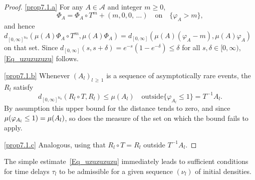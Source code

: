 \documentclass[AHL,Unicode,longabstracts]{cedram}
\newcommand{\clA}{\mathcal{A}}
\newcommand{\bbN}{\mathbb{N}}
\begin{document}
\begin{proof}\leavevmode

\eqref{prop7.1.a} For any $A\in\clA$ and integer $m\geq0$,
\begin{equation}\label{Eq_KeyToAsyInvarianceOfHittProc}
\Phi_{A}=\Phi_{A}\circ T^{m}+(m,0,0,\,\ldots)\quad \text{on}\quad \{\varphi _{A}>m\}, 
\end{equation}
and hence $d_{[0,\infty]^{\bbN_{0}}}(\mu(A)\Phi_{A}\circ T^{m},\mu(A)\Phi_{A})=d_{[0,\infty]}(\mu(A)(\varphi_{A}-m),\mu(A)\varphi_{A})$ on that set. Since $d_{[0,\infty]}(s,s+\delta)=e^{-s}(1-e^{-\delta})\leq\delta$ for all $s,\delta\in\lbrack0,\infty)$, \eqref{Eq_uzuzuzuzu} follows.

\eqref{prop7.1.b} Whenever $(A_{l})_{l\,\geq\,1}$ is a sequence of asymptotically rare events, the $R_{l}$ satisfy
\begin{equation}
d_{[0,\infty]^{\bbN_{0}}}\left(R_{l}\circ T,R_{l}\right)\leq\mu(A_{l})\quad \text{outside}\{\varphi_{A_{l}}\leq1\}=T^{-1}A_{l}.
\end{equation}
By assumption this upper bound for the distance tends to zero, and since $\mu(\varphi_{A_{l}}\linebreak\leq1)=\mu(A_{l})$, so does the measure of the set on which the bound fails to apply.

\eqref{prop7.1.c} Analogous, using that $R_{l}\circ T=R_{l}$ outside $T^{-1}A_{l}$.
\end{proof}
\vspace{4pt}



The simple estimate~\eqref{Eq_uzuzuzuzu} immediately leads to sufficient conditions for time delays $\tau_{l}$ to be admissible for a given sequence $(\nu_{l})$ of initial densities.
\end{document}
